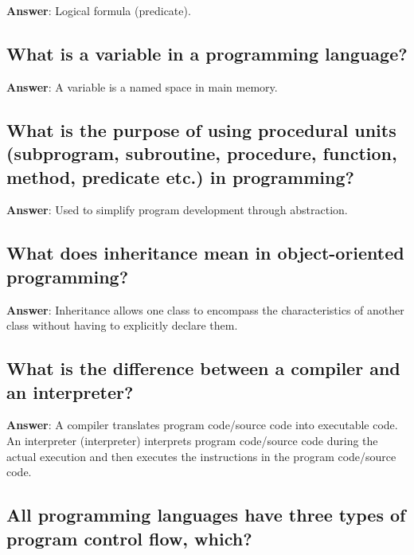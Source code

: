 \documentclass[a4paper,11pt,oneside]{article}
\begin{document}
\begin{sloppypar}
\label{q:216:sa:en:True}

\textbf{Answer}: Logical formula (predicate).



\subsection{What is a variable in a programming language?}

\label{q:217:sa:en:True}

\textbf{Answer}: A variable is a named space in main memory.



\subsection{What is the purpose of using procedural units (subprogram, subroutine, procedure, function, method, predicate etc.) in programming?}

\label{q:218:sa:en:True}

\textbf{Answer}: Used to simplify program development through abstraction.



\subsection{What does inheritance mean in object-oriented programming?}

\label{q:219:sa:en:True}

\textbf{Answer}: Inheritance allows one class to encompass the characteristics of another class without having to explicitly declare them.



\subsection{What is the difference between a compiler and an interpreter?}

\label{q:220:sa:en:True}

\textbf{Answer}: A compiler translates program code/source code into executable code. An interpreter (interpreter) interprets program code/source code during the actual execution and then executes the instructions in the program code/source code.



\subsection{All programming languages have three types of program control flow, which?}


\end{sloppypar}
\end{document}
